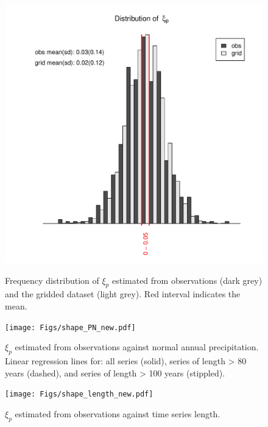 \documentclass[12pt,a4paper,english]{article}
\begin{document}
\begin{figure}[htbp]
\begin{minipage}[t]{0.48\textwidth}
\centering
\includegraphics[width = \linewidth]{Figs/dist_shape.pdf}
\caption[shape]{\label{data:fig3}Frequency distribution of $\xi_{p}$ estimated from observations (dark grey) and the gridded dataset (light grey). Red interval indicates the mean.}
\end{minipage}
\hspace{10mm}
\begin{minipage}[t]{0.52\textwidth}
\centering
\texttt{[image: Figs/shape\_PN\_new.pdf]}
\caption[shape]{\label{data:fig4}$\xi_{p}$ estimated from observations against normal annual precipitation. Linear regression lines for: all series (solid), series of length > 80 years (dashed), and series of length > 100 years (stippled).}
\end{minipage}
\end{figure}

\clearpage

\begin{figure}[!htbp]
\begin{center}
\texttt{[image: Figs/shape\_length\_new.pdf]}
\caption[shape]{\label{data:fig5}$\xi_{p}$ estimated from observations against time series length.}
\end{center}
\end{figure}
\end{document}
